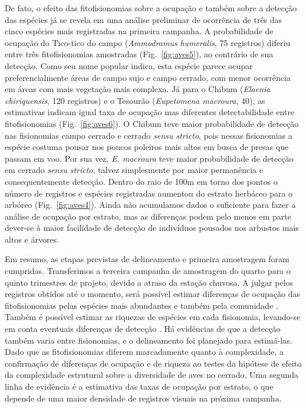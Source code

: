 \documentclass[12pt, A4]{article}
\begin{document}
De fato, o efeito das fitofisionomias sobre a ocupação e também sobre
a detecção das espécies já se revela em uma análise preliminar
de ocorrência de três das cinco espécies mais registradas na
primeira campanha. A probabilidade de ocupação do  Tico-tico 
do campo  (\textit{Ammodramus humeralis}, 75 registros) 
diferiu entre três fitofisionomias amostradas
(Fig.~\ref{fig:aves5}), ao contrário de sua detecção. 
Como seu nome popular indica, esta espécie parece ocupar
preferencialmente áreas de campo sujo e campo cerrado, com menor
ocorrência em áreas com mais vegetação mais complexa. Já para o Chibum
(\textit{Elaenia chiriquensis}, 120 registros) e o Tesourão (\textit{Eupetomena
macroura}, 40), as estimativas indicam igual taxa de ocupação mas diferentes 
detectabilidade entre fitofisionomias 
(Fig.~\ref{fig:aves6}). O Chibum teve maior
probabilidade de detecção nas fisionomias campo cerrado e cerrado
\textit{sensu stricto}, pois nessas fisionomias a espécie costuma pousar nos poucos 
poleiros mais altos em busca de presas que passam em voo. Por sua vez,
\textit{E. macroura} teve maior probabilidade de detecção em cerrado
\textit{sensu stricto}, talvez simplesmente por
maior permanência e consequentemente detecção.
Dentro do raio de 100m em torno dos pontos o número de registros e 
espécies registradas  aumentou
do estrato herbáceo para o arbóreo (Fig.~\ref{fig:aves4}).  
Ainda não acumulamos 
dados o suficiente para fazer a análise de ocupação
por estrato, mas as diferenças podem pelo menos em parte dever-se 
à maior facilidade de detecção de indivíduos pousados
nos arbustos mais altos e árvores. 

Em resumo, as etapas previstas de delineamento e primeira amostragem
foram cumpridas. Transferimos a terceira campanha de amostragem do quarto para o
quinto trimestres de projeto, devido a atraso da estação chuvosa. 
A julgar pelos registros obtidos até o momento,
será possível estimar diferenças de ocupação das fitofisionomias
pelas espécies mais abundantes e também pela comunidade \citep{dorazio2005}.
Também é possível estimar as riquezas de espécies
em cada fisionomia, levando-se em conta eventuais diferenças de detecção \citep{dorazio2006}.
Há evidências de que a detecção também varia entre fisionomias,
e o delineamento foi planejado para estimá-las.
Dado que as fitofisionomias diferem marcadamente quanto à complexidade,
a confirmação de diferenças de ocupação e de riqueza ao testes
da hipótese de efeito da complexidade estrutural sobre a diversidade
de aves no cerrado. Uma segunda linha de evidência é a estimativa das
taxas de ocupação por estrato, o que depende de uma maior densidade de 
registros visuais na próxima campanha.
\end{document}

